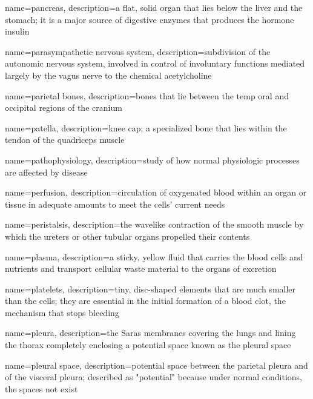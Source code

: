 \documentclass[../../EMT-169.tex]{subfiles}
\begin{document}
	{
		name=pancreas,
		description={a flat, solid organ that lies below the liver and the stomach; it is a major source of digestive enzymes that produces the hormone insulin}
	}
	
	{
		name=parasympathetic nervous system,
		description={subdivision of the autonomic nervous system, involved in control of involuntary functions mediated largely by the vagus nerve to the chemical acetylcholine}
	}
	
	{
		name=parietal bones,
		description={bones that lie between the temp oral and occipital regions of the cranium}
	}
	
	{
		name=patella,
		description={knee cap; a specialized bone that lies within the tendon of the quadriceps muscle}
	}
	
	{
		name=pathophysiology,
		description={study of how normal physiologic processes are affected by disease}
	}
	
	{
		name=perfusion,
		description={circulation of oxygenated blood within an organ or tissue in adequate amounts to meet the cells' current needs}
	}
	
	{
		name=peristalsis,
		description={the wavelike contraction of the smooth muscle by which the ureters or other tubular organs propelled their contents}
	}
	
	{
		name=plasma,
		description={a sticky, yellow fluid that carries the blood cells and nutrients and transport cellular waste material to the organs of excretion }
	}
	
	{
		name=platelets,
		description={tiny, disc-shaped elements that are much smaller than the cells; they are essential in the initial formation of a blood clot, the mechanism that stops bleeding}
	}
	
	{
		name=pleura,
		description={the Saras membranes covering the lungs and lining the thorax completely enclosing a potential space known as the pleural space}
	}
	
	{
		name=pleural space,
		description={potential space between the parietal pleura and of the visceral pleura; described as "potential" because under normal conditions, the spaces not exist}
	}
	
\end{document}
